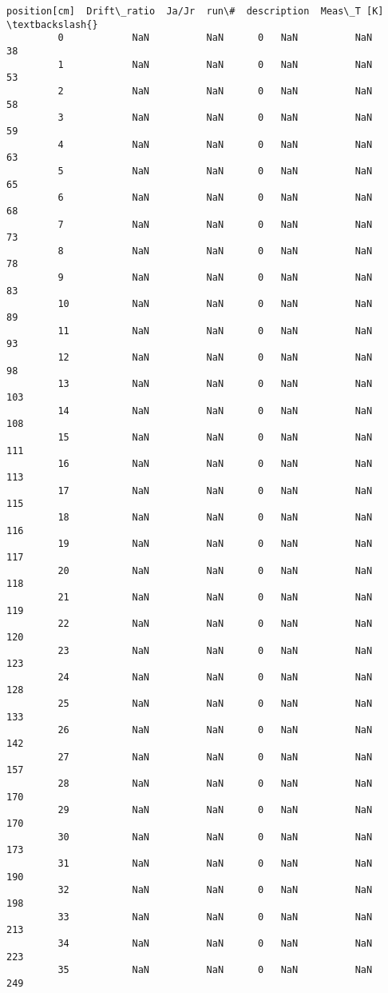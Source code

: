 \documentclass{article}
\begin{document}
\begin{Verbatim}[commandchars=\\\{\}]
             position[cm]  Drift\_ratio  Ja/Jr  run\#  description  Meas\_T [K]  \textbackslash{}
         0            NaN          NaN      0   NaN          NaN          38   
         1            NaN          NaN      0   NaN          NaN          53   
         2            NaN          NaN      0   NaN          NaN          58   
         3            NaN          NaN      0   NaN          NaN          59   
         4            NaN          NaN      0   NaN          NaN          63   
         5            NaN          NaN      0   NaN          NaN          65   
         6            NaN          NaN      0   NaN          NaN          68   
         7            NaN          NaN      0   NaN          NaN          73   
         8            NaN          NaN      0   NaN          NaN          78   
         9            NaN          NaN      0   NaN          NaN          83   
         10           NaN          NaN      0   NaN          NaN          89   
         11           NaN          NaN      0   NaN          NaN          93   
         12           NaN          NaN      0   NaN          NaN          98   
         13           NaN          NaN      0   NaN          NaN         103   
         14           NaN          NaN      0   NaN          NaN         108   
         15           NaN          NaN      0   NaN          NaN         111   
         16           NaN          NaN      0   NaN          NaN         113   
         17           NaN          NaN      0   NaN          NaN         115   
         18           NaN          NaN      0   NaN          NaN         116   
         19           NaN          NaN      0   NaN          NaN         117   
         20           NaN          NaN      0   NaN          NaN         118   
         21           NaN          NaN      0   NaN          NaN         119   
         22           NaN          NaN      0   NaN          NaN         120   
         23           NaN          NaN      0   NaN          NaN         123   
         24           NaN          NaN      0   NaN          NaN         128   
         25           NaN          NaN      0   NaN          NaN         133   
         26           NaN          NaN      0   NaN          NaN         142   
         27           NaN          NaN      0   NaN          NaN         157   
         28           NaN          NaN      0   NaN          NaN         170   
         29           NaN          NaN      0   NaN          NaN         170   
         30           NaN          NaN      0   NaN          NaN         173   
         31           NaN          NaN      0   NaN          NaN         190   
         32           NaN          NaN      0   NaN          NaN         198   
         33           NaN          NaN      0   NaN          NaN         213   
         34           NaN          NaN      0   NaN          NaN         223   
         35           NaN          NaN      0   NaN          NaN         249   
         

\end{Verbatim}
\end{document}
